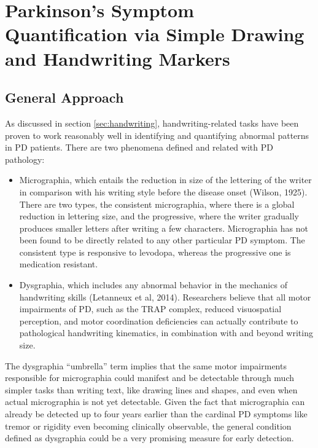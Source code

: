 \chapter{Parkinson's Symptom Quantification via Simple Drawing and Handwriting Markers}
\label{ch:handwriting}
\pagestyle{fancy}
\fancyhf{}
\fancyhead[OC]{\leftmark}
\fancyhead[EC]{\rightmark}
\cfoot{\thepage}

\section{General Approach}
\label{sec:PenGenApproach}
As discussed in section \ref{sec:handwriting}, handwriting-related tasks have been proven to work reasonably well in identifying and quantifying abnormal patterns in \gls{PD} patients. There are two phenomena defined and related with \gls{PD} pathology:

\begin{itemize}
\item Micrographia, which entails the reduction in size of the lettering of the writer in comparison with his writing style before the disease onset (Wilson, 1925). There are two types, the consistent micrographia, where there is a global reduction in lettering size, and the progressive, where the writer gradually produces smaller letters after writing a few characters. Micrographia has not been found to be directly related to any other particular \gls{PD} symptom. The consistent type is responsive to levodopa, whereas the progressive one is medication resistant. 
\item Dysgraphia, which includes any abnormal behavior in the mechanics of handwriting skills (Letanneux et al, 2014). Researchers believe that all motor impairments of \gls{PD}, such as the \gls{TRAP} complex, reduced visuospatial perception, and motor coordination deficiencies can actually contribute to pathological handwriting kinematics, in combination with and beyond writing size. 
\end{itemize}

\noindent
The dysgraphia ``umbrella'' term implies that the same motor impairments responsible for micrographia could manifest and be detectable through much simpler tasks than writing text, like drawing lines and shapes, and even when actual micrographia is not yet detectable. Given the fact that micrographia can already be detected up to four years earlier than the cardinal \gls{PD} symptoms like tremor or rigidity even becoming clinically observable, the general condition defined as dysgraphia could be a very promising measure for early detection. 

